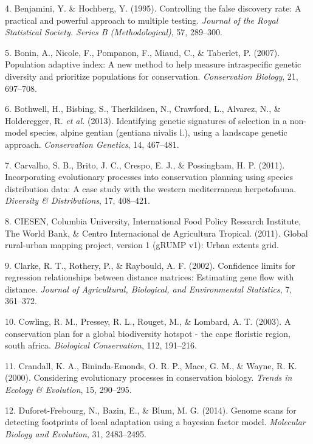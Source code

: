\documentclass[11pt,]{article}
\begin{document}
\hypertarget{ref-r466}{}
4. Benjamini, Y. \& Hochberg, Y. (1995). Controlling the false discovery
rate: A practical and powerful approach to multiple testing.
\emph{Journal of the Royal Statistical Society. Series B
(Methodological)}, 57, 289--300.

\hypertarget{ref-r157}{}
5. Bonin, A., Nicole, F., Pompanon, F., Miaud, C., \& Taberlet, P.
(2007). Population adaptive index: A new method to help measure
intraspecific genetic diversity and prioritize populations for
conservation. \emph{Conservation Biology}, 21, 697--708.

\hypertarget{ref-r455}{}
6. Bothwell, H., Bisbing, S., Therkildsen, N., Crawford, L., Alvarez,
N., \& Holderegger, R. \emph{et al.} (2013). Identifying genetic
signatures of selection in a non-model species, alpine gentian (gentiana
nivalis l.), using a landscape genetic approach. \emph{Conservation
Genetics}, 14, 467--481.

\hypertarget{ref-r2}{}
7. Carvalho, S. B., Brito, J. C., Crespo, E. J., \& Possingham, H. P.
(2011). Incorporating evolutionary processes into conservation planning
using species distribution data: A case study with the western
mediterranean herpetofauna. \emph{Diversity \& Distributions}, 17,
408--421.

\hypertarget{ref-r472}{}
8. CIESEN, Columbia University, International Food Policy Research
Institute, The World Bank, \& Centro Internacional de Agricultura
Tropical. (2011). Global rural-urban mapping project, version 1 (gRUMP
v1): Urban extents grid.

\hypertarget{ref-r494}{}
9. Clarke, R. T., Rothery, P., \& Raybould, A. F. (2002). Confidence
limits for regression relationships between distance matrices:
Estimating gene flow with distance. \emph{Journal of Agricultural,
Biological, and Environmental Statistics}, 7, 361--372.

\hypertarget{ref-r197}{}
10. Cowling, R. M., Pressey, R. L., Rouget, M., \& Lombard, A. T.
(2003). A conservation plan for a global biodiversity hotspot - the cape
floristic region, south africa. \emph{Biological Conservation}, 112,
191--216.

\hypertarget{ref-r3}{}
11. Crandall, K. A., Bininda-Emonds, O. R. P., Mace, G. M., \& Wayne, R.
K. (2000). Considering evolutionary processes in conservation biology.
\emph{Trends in Ecology \& Evolution}, 15, 290--295.

\hypertarget{ref-r487}{}
12. Duforet-Frebourg, N., Bazin, E., \& Blum, M. G. (2014). Genome scans
for detecting footprints of local adaptation using a bayesian factor
model. \emph{Molecular Biology and Evolution}, 31, 2483--2495.
\end{document}
